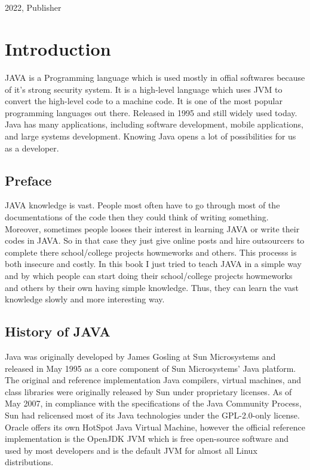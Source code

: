 \documentclass[A4 paper,openany]{book}  %
\begin{document}
\begin{titlepage}
{\begin{verbatim}
                                                                                                      
                                                                                                      
        \end{verbatim}
    }
    \vfill
    {\small{2022, Publisher}}
\end{titlepage}


\pagecolor{smokeWhite}
\color{black}
\newpage
\tableofcontents
\newpage
\listoffigures
\newpage
\listoftables
\newpage

\part{Introduction}
JAVA is a Programming language which is used mostly in offial softwares because of it's strong security system.
It is a high-level language which uses JVM to convert the high-level code to a machine code.
It is one of the most popular programming languages out there. Released in 1995 and still widely used today.
Java has many applications, including software development, mobile applications, and large systems development.
Knowing Java opens a lot of possibilities for us as a developer.

\chapter*{Preface}
JAVA knowledge is vast. People most often have to go through most of the documentations of the code then they could think of writing something.
Moreover, sometimes people looses their interest in learning JAVA or write their codes in JAVA. So in that case they just give online posts
and hire outsourcers to complete there school/college projects howmeworks and others.
This processs is both insecure and costly. In this book I just tried to teach JAVA  in a simple way and by which
people can start doing their school/college projects howmeworks and others by their own having simple knowledge. Thus, they can learn the vast knowledge slowly and more interesting way.


\chapter{History of JAVA}
Java was originally developed by James Gosling at Sun Microsystems and released in May 1995 as a core component of Sun Microsystems' Java platform.
The original and reference implementation Java compilers, virtual machines, and class libraries were originally released by Sun under proprietary licenses.
As of May 2007, in compliance with the specifications of the Java Community Process, Sun had relicensed most of its Java technologies under the GPL-2.0-only license.
Oracle offers its own HotSpot Java Virtual Machine, however the official reference implementation is the OpenJDK JVM which is free open-source software and used by most developers
and is the default JVM for almost all Linux distributions.
\end{document}
